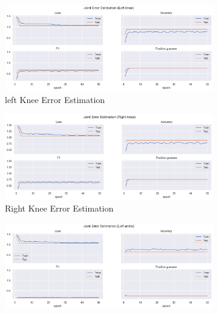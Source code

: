   
  \begin{figure}[!ht]
    \centering
    \begin{subfigure}[b]{0.47\linewidth}
        \centering
        \includegraphics[width=\textwidth]{figures/Results/v2/jt/Left knee_ErrorEstimation.png}
        \caption{left Knee Error Estimation}
        \label{fig:v2_lekn_jt_ee}
    \end{subfigure}
    \hfill
    \begin{subfigure}[b]{0.47\linewidth}
        \centering
        \includegraphics[width=\textwidth]{figures/Results/v2/jt/Right knee_ErrorEstimation.png}
        \caption{Right Knee Error Estimation}
        \label{fig:v2_rikn_jt_ee}
    \end{subfigure}
    \hfill
    \begin{subfigure}[b]{0.47\linewidth}
        \centering
        \includegraphics[width=\textwidth]{figures/Results/v2/jt/Left ankle_ErrorEstimation.png}

\end{subfigure}
\end{figure}
